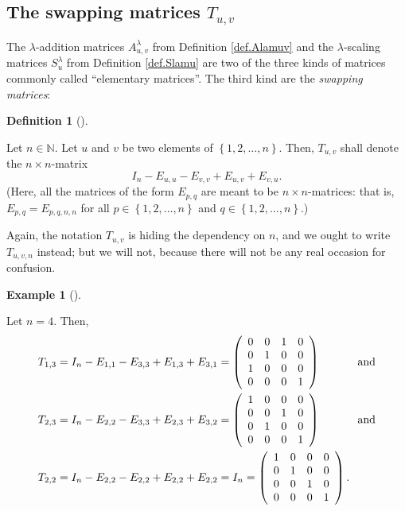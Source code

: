 \documentclass[numbers=enddot,12pt,final,onecolumn,notitlepage]{scrartcl}%
\theoremstyle{definition}
\newtheorem{defi}[theo]{Definition}
\newenvironment{definition}[1][]
{\begin{defi}[#1]\begin{leftbar}}
{\end{leftbar}\end{defi}}
\newtheorem{exam}[theo]{Example}
\newenvironment{example}[1][]
{\begin{exam}[#1]\begin{leftbar}}
{\end{leftbar}\end{exam}}
\begin{document}
\subsection{The swapping matrices $T_{u,v}$}

The $\lambda$-addition matrices $A_{u,v}^{\lambda}$ from Definition
\ref{def.Alamuv} and the $\lambda$-scaling matrices $S_{u}^{\lambda}$ from
Definition \ref{def.Slamu} are two of the three kinds of matrices commonly
called \textquotedblleft elementary matrices\textquotedblright. The third kind
are the \textit{swapping matrices}:

\begin{definition}
\label{def.Tuv}Let $n\in\mathbb{N}$. Let $u$ and $v$ be two elements of
$\left\{  1,2,\ldots,n\right\}  $. Then, $T_{u,v}$ shall denote the $n\times
n$-matrix
\[
I_{n}-E_{u,u}-E_{v,v}+E_{u,v}+E_{v,u}.
\]
(Here, all the matrices of the form $E_{p,q}$ are meant to be $n\times
n$-matrices: that is, $E_{p,q}=E_{p,q,n,n}$ for all $p\in\left\{
1,2,\ldots,n\right\}  $ and $q\in\left\{  1,2,\ldots,n\right\}  $.)

Again, the notation $T_{u,v}$ is hiding the dependency on $n$, and we ought to
write $T_{u,v,n}$ instead; but we will not, because there will not be any real
occasion for confusion.
\end{definition}

\begin{example}
Let $n=4$. Then,%
\begin{align*}
T_{1,3}  &  =I_{n}-E_{1,1}-E_{3,3}+E_{1,3}+E_{3,1}=\left(
\begin{array}
[c]{cccc}%
0 & 0 & 1 & 0\\
0 & 1 & 0 & 0\\
1 & 0 & 0 & 0\\
0 & 0 & 0 & 1
\end{array}
\right)  \ \ \ \ \ \ \ \ \ \ \text{and}\\
T_{2,3}  &  =I_{n}-E_{2,2}-E_{3,3}+E_{2,3}+E_{3,2}=\left(
\begin{array}
[c]{cccc}%
1 & 0 & 0 & 0\\
0 & 0 & 1 & 0\\
0 & 1 & 0 & 0\\
0 & 0 & 0 & 1
\end{array}
\right)  \ \ \ \ \ \ \ \ \ \ \text{and}\\
T_{2,2}  &  =I_{n}-E_{2,2}-E_{2,2}+E_{2,2}+E_{2,2}=I_{n}=\left(
\begin{array}
[c]{cccc}%
1 & 0 & 0 & 0\\
0 & 1 & 0 & 0\\
0 & 0 & 1 & 0\\
0 & 0 & 0 & 1
\end{array}
\right)  .
\end{align*}

\end{example}
\end{document}
